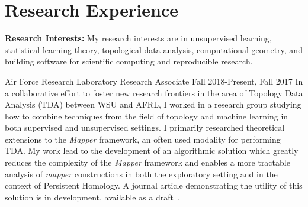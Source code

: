 \documentclass[11pt,a4paper,sans]{moderncv} %
\begin{document}

%


\section{Research Experience}
\textbf{Research Interests: } My research interests are in unsupervised learning, statistical learning theory, topological data analysis, computational geometry, and building software for scientific computing and reproducible research.  
\newline 

			 {Air Force Research Laboratory}
			 {Research Associate}
			 {Fall 2018-Present, Fall 2017}{}{\vspace{3pt}
			 In a collaborative effort to foster new research frontiers in the area of Topology Data Analysis (TDA) between WSU and AFRL, I worked in a research group studying how to combine techniques from  the field of topology and machine learning in both supervised and unsupervised settings. I primarily researched theoretical extensions to the \textit{Mapper} framework, an often used modality for performing TDA. 
			 My work lead to the development of an algorithmic solution which greatly reduces the complexity of the \textit{Mapper} framework and enables a more tractable analysis of {\em mapper} constructions in both the exploratory setting and in the context of Persistent Homology. A journal article demonstrating the utility of this solution is in development, available as a draft~\cite{mapperext}. 
}
\end{document}
